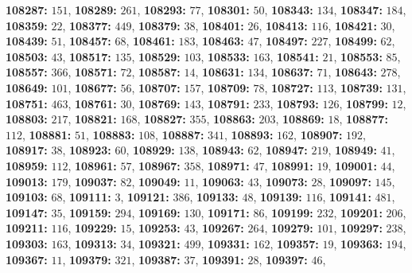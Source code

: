\textsf{\bfseries 108287:} $151$, \textsf{\bfseries 108289:} $261$, \textsf{\bfseries 108293:} $77$, \textsf{\bfseries 108301:} $50$, \textsf{\bfseries 108343:} $134$, \textsf{\bfseries 108347:} $184$, \textsf{\bfseries 108359:} $22$, \textsf{\bfseries 108377:} $449$, \textsf{\bfseries 108379:} $38$, \textsf{\bfseries 108401:} $26$, \textsf{\bfseries 108413:} $116$, \textsf{\bfseries 108421:} $30$, \textsf{\bfseries 108439:} $51$, \textsf{\bfseries 108457:} $68$, \textsf{\bfseries 108461:} $183$, \textsf{\bfseries 108463:} $47$, \textsf{\bfseries 108497:} $227$, \textsf{\bfseries 108499:} $62$, \textsf{\bfseries 108503:} $43$, \textsf{\bfseries 108517:} $135$, \textsf{\bfseries 108529:} $103$, \textsf{\bfseries 108533:} $163$, \textsf{\bfseries 108541:} $21$, \textsf{\bfseries 108553:} $85$, \textsf{\bfseries 108557:} $366$, \textsf{\bfseries 108571:} $72$, \textsf{\bfseries 108587:} $14$, \textsf{\bfseries 108631:} $134$, \textsf{\bfseries 108637:} $71$, \textsf{\bfseries 108643:} $278$, \textsf{\bfseries 108649:} $101$, \textsf{\bfseries 108677:} $56$, \textsf{\bfseries 108707:} $157$, \textsf{\bfseries 108709:} $78$, \textsf{\bfseries 108727:} $113$, \textsf{\bfseries 108739:} $131$, \textsf{\bfseries 108751:} $463$, \textsf{\bfseries 108761:} $30$, \textsf{\bfseries 108769:} $143$, \textsf{\bfseries 108791:} $233$, \textsf{\bfseries 108793:} $126$, \textsf{\bfseries 108799:} $12$, \textsf{\bfseries 108803:} $217$, \textsf{\bfseries 108821:} $168$, \textsf{\bfseries 108827:} $355$, \textsf{\bfseries 108863:} $203$, \textsf{\bfseries 108869:} $18$, \textsf{\bfseries 108877:} $112$, \textsf{\bfseries 108881:} $51$, \textsf{\bfseries 108883:} $108$, \textsf{\bfseries 108887:} $341$, \textsf{\bfseries 108893:} $162$, \textsf{\bfseries 108907:} $192$, \textsf{\bfseries 108917:} $38$, \textsf{\bfseries 108923:} $60$, \textsf{\bfseries 108929:} $138$, \textsf{\bfseries 108943:} $62$, \textsf{\bfseries 108947:} $219$, \textsf{\bfseries 108949:} $41$, \textsf{\bfseries 108959:} $112$, \textsf{\bfseries 108961:} $57$, \textsf{\bfseries 108967:} $358$, \textsf{\bfseries 108971:} $47$, \textsf{\bfseries 108991:} $19$, \textsf{\bfseries 109001:} $44$, \textsf{\bfseries 109013:} $179$, \textsf{\bfseries 109037:} $82$, \textsf{\bfseries 109049:} $11$, \textsf{\bfseries 109063:} $43$, \textsf{\bfseries 109073:} $28$, \textsf{\bfseries 109097:} $145$, \textsf{\bfseries 109103:} $68$, \textsf{\bfseries 109111:} $3$, \textsf{\bfseries 109121:} $386$, \textsf{\bfseries 109133:} $48$, \textsf{\bfseries 109139:} $116$, \textsf{\bfseries 109141:} $481$, \textsf{\bfseries 109147:} $35$, \textsf{\bfseries 109159:} $294$, \textsf{\bfseries 109169:} $130$, \textsf{\bfseries 109171:} $86$, \textsf{\bfseries 109199:} $232$, \textsf{\bfseries 109201:} $206$, \textsf{\bfseries 109211:} $116$, \textsf{\bfseries 109229:} $15$, \textsf{\bfseries 109253:} $43$, \textsf{\bfseries 109267:} $264$, \textsf{\bfseries 109279:} $101$, \textsf{\bfseries 109297:} $238$, \textsf{\bfseries 109303:} $163$, \textsf{\bfseries 109313:} $34$, \textsf{\bfseries 109321:} $499$, \textsf{\bfseries 109331:} $162$, \textsf{\bfseries 109357:} $19$, \textsf{\bfseries 109363:} $194$, \textsf{\bfseries 109367:} $11$, \textsf{\bfseries 109379:} $321$, \textsf{\bfseries 109387:} $37$, \textsf{\bfseries 109391:} $28$, \textsf{\bfseries 109397:} $46$, 
